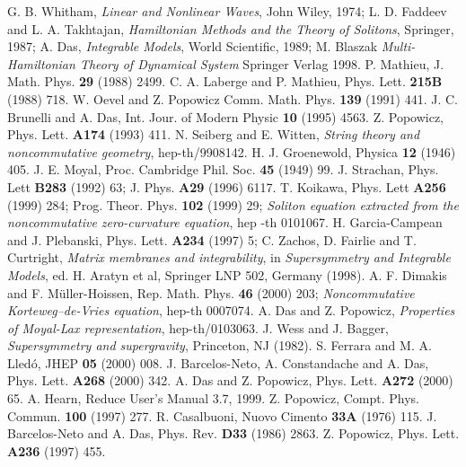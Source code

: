 \documentclass[a4paper,11pt]{article}
\begin{document}
\begin{thebibliography}{99}
 G. B. Whitham, {\it Linear and Nonlinear Waves}, John
Wiley, 1974; L. D. Faddeev and L. A. Takhtajan, {\it Hamiltonian
Methods and  the Theory of Solitons}, Springer, 1987; 
A. Das, {\it Integrable Models}, World Scientific, 1989;
M. Blaszak {\it Multi-Hamiltonian Theory of Dynamical System} Springer
Verlag  1998.
 P. Mathieu, 
J. Math. Phys. {\bf 29} (1988) 2499.
 C. A. Laberge and P. Mathieu, Phys. Lett. {\bf 215B}
(1988) 718.
 W. Oevel and Z. Popowicz
Comm. Math. Phys. {\bf 139} (1991) 441.
 J. C. Brunelli and  A. Das, Int. Jour. of Modern Physic {\bf
10} (1995) 4563.
 Z. Popowicz, Phys. Lett. {\bf A174} (1993) 411.  
 N. Seiberg and E. Witten, {\it String theory and
noncommutative geometry}, hep-th/9908142.
 H. J. Groenewold, Physica {\bf 12} (1946) 405.
 J. E. Moyal, Proc. Cambridge Phil. Soc. {\bf 45} (1949) 99.
 J. Strachan, Phys. Lett {\bf B283} (1992) 63; J. Phys. {\bf
A29} (1996) 6117.
 T. Koikawa, Phys. Lett {\bf A256}
(1999) 284; Prog. Theor. Phys. {\bf 102} (1999) 29; {\it Soliton
equation extracted  from the noncommutative 
zero-curvature equation}, hep -th 0101067. 
 H. Garcia-Campean and J. Plebanski, Phys. Lett. {\bf
A234} (1997) 5; C. Zachos, D. Fairlie and T. Curtright, {\it Matrix
membranes and integrability}, in  {\it Supersymmetry and Integrable
Models}, ed. H. Aratyn et al, Springer LNP 502, Germany (1998).
 A. F. Dimakis and F. M\"{u}ller-Hoissen,
Rep. Math. Phys. {\bf 46} (2000) 203;  {\it Noncommutative 
Korteweg--de-Vries equation}, hep-th 0007074.
 A. Das and Z. Popowicz, {\it Properties of Moyal-Lax
representation}, hep-th/0103063.
 J. Wess and J. Bagger, {\it Supersymmetry and
supergravity}, Princeton, NJ (1982).
 S. Ferrara and M. A. Lled\'{o}, JHEP {\bf 05} (2000) 008.
 J. Barcelos-Neto, A. Constandache and A. Das,
Phys. Lett. {\bf A268} (2000) 342.
 A. Das and Z. Popowicz, Phys. Lett. {\bf A272} (2000) 65.
 A. Hearn, Reduce User's Manual 3.7, 1999.
 Z. Popowicz, Compt. Phys. Commun. {\bf 100} (1997) 277.
 R. Casalbuoni, Nuovo Cimento {\bf 33A} (1976) 115.
 J. Barcelos-Neto and A. Das, Phys. Rev. {\bf D33} (1986) 2863.
 Z. Popowicz, Phys. Lett. {\bf A236} (1997) 455.

\end{thebibliography}
\end{document}

